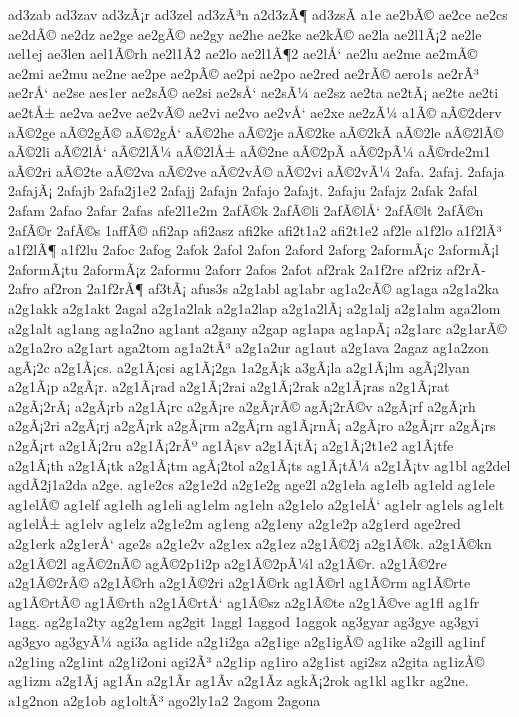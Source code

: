 {ad3zab
ad3zav
ad3zÃ¡r
ad3zel
ad3zÃ³n
a2d3zÃ¶
ad3zsÃ­
a1e
ae2bÃ©
ae2ce
ae2cs
ae2dÃ©
ae2dz
ae2ge
ae2gÃ©
ae2gy
ae2he
ae2ke
ae2kÃ©
ae2la
ae2l1Ã¡2
ae2le
ael1ej
ae3len
ael1Ã©rh
ae2l1Ã­2
ae2lo
ae2l1Ã¶2
ae2lÅ‘
ae2lu
ae2me
ae2mÃ©
ae2mi
ae2mu
ae2ne
ae2pe
ae2pÃ©
ae2pi
ae2po
ae2red
ae2rÃ©
aero1s
ae2rÃ³
ae2rÅ‘
ae2se
aes1er
ae2sÃ©
ae2si
ae2sÅ‘
ae2sÃ¼
ae2sz
ae2ta
ae2tÃ¡
ae2te
ae2ti
ae2tÅ±
ae2va
ae2ve
ae2vÃ©
ae2vi
ae2vo
ae2vÅ‘
ae2xe
ae2zÃ¼
a1Ã©
aÃ©2derv
aÃ©2ge
aÃ©2gÃ©
aÃ©2gÅ‘
aÃ©2he
aÃ©2je
aÃ©2ke
aÃ©2kÃ­
aÃ©2le
aÃ©2lÃ©
aÃ©2li
aÃ©2lÅ‘
aÃ©2lÃ¼
aÃ©2lÅ±
aÃ©2ne
aÃ©2pÃ­
aÃ©2pÃ¼
aÃ©rde2m1
aÃ©2ri
aÃ©2te
aÃ©2va
aÃ©2ve
aÃ©2vÃ©
aÃ©2vi
aÃ©2vÃ¼
2afa.
2afaj.
2afaja
2afajÃ¡
2afajb
2afa2j1e2
2afajj
2afajn
2afajo
2afajt.
2afaju
2afajz
2afak
2afal
2afam
2afao
2afar
2afas
afe2l1e2m
2afÃ©k
2afÃ©li
2afÃ©lÅ‘
2afÃ©lt
2afÃ©n
2afÃ©r
2afÃ©s
1affÃ©
afi2ap
afi2asz
afi2ke
afi2t1a2
afi2t1e2
af2le
a1f2lo
a1f2lÃ³
a1f2lÃ¶
a1f2lu
2afoc
2afog
2afok
2afol
2afon
2aford
2aforg
2aformÃ¡c
2aformÃ¡l
2aformÃ¡tu
2aformÃ¡z
2aformu
2aforr
2afos
2afot
af2rak
2a1f2re
af2riz
af2rÃ­
2afro
af2ron
2a1f2rÃ¶
af3tÃ¡
afus3s
a2g1abl
ag1abr
ag1a2cÃ©
ag1aga
a2g1a2ka
a2g1akk
a2g1akt
2agal
a2g1a2lak
a2g1a2lap
a2g1a2lÃ¡
a2g1alj
a2g1alm
aga2lom
a2g1alt
ag1ang
ag1a2no
ag1ant
a2gany
a2gap
ag1apa
ag1apÃ¡
a2g1arc
a2g1arÃ©
a2g1a2ro
a2g1art
aga2tom
ag1a2tÃ³
a2g1a2ur
ag1aut
a2g1ava
2agaz
ag1a2zon
agÃ¡2c
a2g1Ã¡cs.
a2g1Ã¡csi
ag1Ã¡2ga
1a2gÃ¡k
a3gÃ¡la
a2g1Ã¡lm
agÃ¡2lyan
a2g1Ã¡p
a2gÃ¡r.
a2g1Ã¡rad
a2g1Ã¡2rai
a2g1Ã¡2rak
a2g1Ã¡ras
a2g1Ã¡rat
a2gÃ¡2rÃ¡
a2gÃ¡rb
a2g1Ã¡rc
a2gÃ¡re
a2gÃ¡rÃ©
agÃ¡2rÃ©v
a2gÃ¡rf
a2gÃ¡rh
a2gÃ¡2ri
a2gÃ¡rj
a2gÃ¡rk
a2gÃ¡rm
a2gÃ¡rn
ag1Ã¡rnÃ¡
a2gÃ¡ro
a2gÃ¡rr
a2gÃ¡rs
a2gÃ¡rt
a2g1Ã¡2ru
a2g1Ã¡2rÃº
ag1Ã¡sv
a2g1Ã¡tÃ¡
a2g1Ã¡2t1e2
ag1Ã¡tfe
a2g1Ã¡th
a2g1Ã¡tk
a2g1Ã¡tm
agÃ¡2tol
a2g1Ã¡ts
ag1Ã¡tÃ¼
a2g1Ã¡tv
ag1bl
ag2del
agdÃ­2j1a2da
a2ge.
ag1e2cs
a2g1e2d
a2g1e2g
age2l
a2g1ela
ag1elb
ag1eld
ag1ele
ag1elÃ©
ag1elf
ag1elh
ag1eli
ag1elm
ag1eln
a2g1elo
a2g1elÅ‘
ag1elr
ag1els
ag1elt
ag1elÅ±
ag1elv
ag1elz
a2g1e2m
ag1eng
a2g1eny
a2g1e2p
a2g1erd
age2red
a2g1erk
a2g1erÅ‘
age2s
a2g1e2v
a2g1ex
a2g1ez
a2g1Ã©2j
a2g1Ã©k.
a2g1Ã©kn
a2g1Ã©2l
agÃ©2nÃ©
agÃ©2p1i2p
a2g1Ã©2pÃ¼l
a2g1Ã©r.
a2g1Ã©2re
a2g1Ã©2rÃ©
a2g1Ã©rh
a2g1Ã©2ri
a2g1Ã©rk
ag1Ã©rl
ag1Ã©rm
ag1Ã©rte
ag1Ã©rtÃ©
ag1Ã©rth
a2g1Ã©rtÅ‘
ag1Ã©sz
a2g1Ã©te
a2g1Ã©ve
ag1fl
ag1fr
1agg.
ag2g1a2ty
ag2g1em
ag2git
1aggl
1aggod
1aggok
ag3gyar
ag3gye
ag3gyi
ag3gyo
ag3gyÃ¼
agi3a
ag1ide
a2g1i2ga
a2g1ige
a2g1igÃ©
ag1ike
a2gill
ag1inf
a2g1ing
a2g1int
a2g1i2oni
agi2Ã³
a2g1ip
ag1iro
a2g1ist
agi2sz
a2gita
ag1izÃ©
ag1izm
a2g1Ã­j
ag1Ã­n
a2g1Ã­r
ag1Ã­v
a2g1Ã­z
agkÃ¡2rok
ag1kl
ag1kr
ag2ne.
a1g2non
a2g1ob
ag1oltÃ³
ago2ly1a2
2agom
2agona
}
